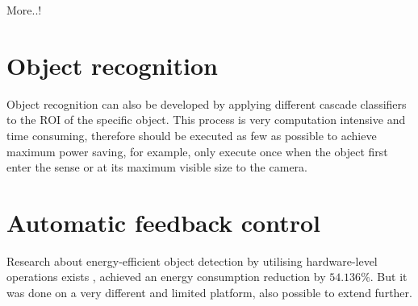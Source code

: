 {\color{red}More..!}

\section{Object recognition}

Object recognition can also be developed by applying different cascade classifiers to the ROI of the specific object. This process is very computation intensive and time consuming, therefore should be executed as few as possible to achieve maximum power saving, for example, only execute once when the object first enter the sense or at its maximum visible size to the camera.

\section{Automatic feedback control}

Research about energy-efficient object detection by utilising hardware-level operations exists \cite{casares2011energy}, achieved an energy consumption reduction by $54.136\%$. But it was done on a very different and limited platform, also possible to extend further.
